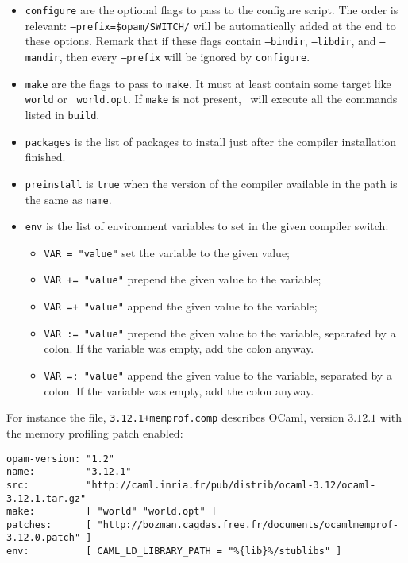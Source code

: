 \documentclass[a4paper,10pt]{article}
\begin{document}
\begin{itemize}
\item {\tt configure} are the optional flags to pass to the configure
  script. The order is relevant: {\tt --prefix=\$opam/SWITCH/} will be automatically
  added at the end to these options.
  Remark that if these flags contain {\tt --bindir}, {\tt --libdir},
  and {\tt --mandir}, then every {\tt --prefix} will be ignored by {\tt configure}.

\item {\tt make} are the flags to pass to {\tt make}.
  It must at least contain some target like {\tt world} or {\tt
    world.opt}. If {\tt make} is not present, \OPAM\ will execute all
  the commands listed in {\tt build}.

\item {\tt packages} is the list of packages to install just after the
  compiler installation finished.

\item {\tt preinstall} is {\tt true} when the version of the compiler available
  in the path is the same as {\tt name}.

\item {\tt env} is the list of environment variables to set in the
  given compiler switch:
\begin{itemize}
\item {\tt VAR = "value"} set the variable to the given value;
\item {\tt VAR += "value"} prepend the given value to the variable;
\item {\tt VAR =+ "value"} append the given value to the variable;
\item {\tt VAR := "value"} prepend the given value to the variable,
  separated by a colon. If the variable was empty, add the
  colon anyway.
\item {\tt VAR =: "value"} append the given value to the variable,
  separated by a colon. If the variable was empty, add the colon
  anyway.
\end{itemize}
\end{itemize}

For instance the file, {\tt 3.12.1+memprof.comp} describes OCaml,
version $3.12.1$ with the memory profiling patch enabled:

\begin{verbatim}
opam-version: "1.2"
name:         "3.12.1"
src:          "http://caml.inria.fr/pub/distrib/ocaml-3.12/ocaml-3.12.1.tar.gz"
make:         [ "world" "world.opt" ]
patches:      [ "http://bozman.cagdas.free.fr/documents/ocamlmemprof-3.12.0.patch" ]
env:          [ CAML_LD_LIBRARY_PATH = "%{lib}%/stublibs" ]
\end{verbatim}
\end{document}
